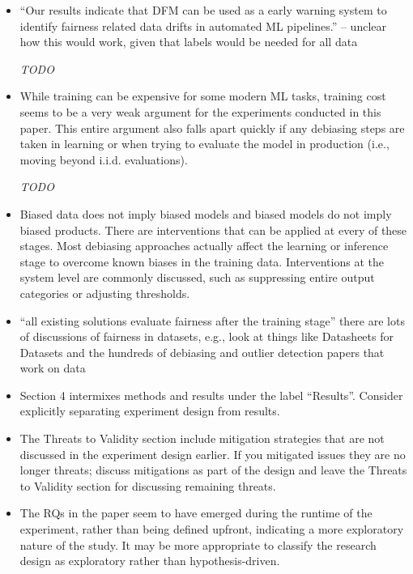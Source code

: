 \documentclass[conference,review,anonymous]{IEEEtran}
\newcommand{\highlight}[1]{\begin{framed}%
  \noindent\emph{#1}
\end{framed}}
\begin{document}
\begin{itemize}
  \item ``Our results indicate that DFM can be used as a early warning
    system to identify fairness related data drifts in automated ML
    pipelines.'' -- unclear how this would work, given that labels
    would be needed for all data

    \highlight{TODO}

  \item While training can be expensive for some modern ML tasks,
    training cost seems to be a very weak argument for the experiments
    conducted in this paper. This entire argument also falls apart
    quickly if any debiasing steps are taken in learning or when
    trying to evaluate the model in production (i.e., moving beyond
    i.i.d. evaluations).

    \highlight{TODO}

  \item Biased data does not imply biased models and biased models do
    not imply biased products. There are interventions that can be
    applied at every of these stages. Most debiasing approaches
    actually affect the learning or inference stage to overcome known
    biases in the training data. Interventions at the system level are
    commonly discussed, such as suppressing entire output categories
    or adjusting thresholds.
  \item ``all existing solutions evaluate fairness after the training
    stage'' there are lots of discussions of fairness in datasets,
    e.g., look at things like Datasheets for Datasets and the hundreds
    of debiasing and outlier detection papers that work on data
  \item Section 4 intermixes methods and results under the label
    ``Results''. Consider explicitly separating experiment design from
    results.
  \item The Threats to Validity section include mitigation strategies
    that are not discussed in the experiment design earlier. If you
    mitigated issues they are no longer threats; discuss mitigations
    as part of the design and leave the Threats to Validity section
    for discussing remaining threats.
  \item The RQs in the paper seem to have emerged during the runtime
    of the experiment, rather than being defined upfront, indicating
    a more exploratory nature of the study. It may be more appropriate
    to classify the research design as exploratory rather than
    hypothesis-driven.

\end{itemize}
\end{document}
